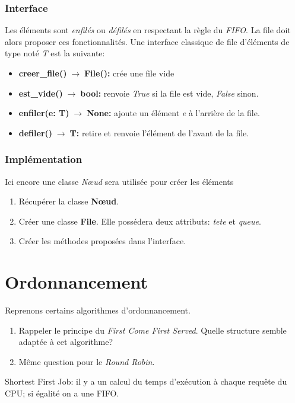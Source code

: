 \documentclass[a4paper,11pt]{article}
\begin{document}
\begin{Form}
\begin{figure}[!h]
\end{figure}
\subsubsection{Interface}
Les éléments sont \emph{enfilés} ou \emph{défilés} en respectant la règle du \emph{FIFO}. La file doit alors proposer ces fonctionnalités. Une interface classique de file  d'éléments de type noté \emph{T} est la suivante:
\begin{itemize}
\item \textbf{creer\_file()$\;\rightarrow\;$File():} crée une file vide
\item \textbf{est\_vide()$\;\rightarrow\;$bool:} renvoie \emph{True} si la file est vide, \emph{False} sinon.
\item \textbf{enfiler(e: T)$\;\rightarrow\;$None:} ajoute un élément \emph{e} à l'arrière de la file.
\item \textbf{defiler()$\;\rightarrow\;$T:} retire et renvoie l'élément de l'avant de la file.
\end{itemize}
\subsubsection{Implémentation}
Ici encore une classe \emph{Nœud} sera utilisée pour créer les éléments
\begin{activite}
\begin{enumerate}
\item Récupérer la classe \textbf{Nœud}. 
\item Créer une classe \textbf{File}. Elle possédera deux attributs: \emph{tete} et \emph{queue}.
\item Créer les méthodes proposées dans l'interface.
\end{enumerate}
\end{activite}
\section{Ordonnancement}
Reprenons certains algorithmes d'ordonnancement.
\begin{activite}
\begin{enumerate}
\item Rappeler le principe du \emph{First Come First Served}. Quelle structure semble adaptée à cet algorithme?
\item Même question pour le \emph{Round Robin}.
\end{enumerate}
\end{activite}
\begin{commentprof}
Shortest First Job: il y a un calcul du temps d'exécution à chaque requête du CPU; si égalité on a une FIFO.
\end{commentprof}
\end{Form}
\end{document}
